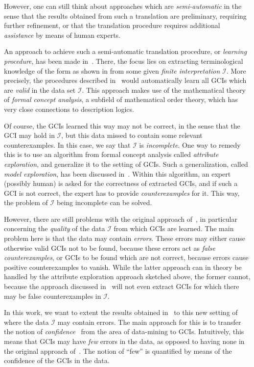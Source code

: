 However, one can still think about approaches which are \emph{semi-automatic} in the sense
that the results obtained from such a translation are preliminary, requiring further
refinement, or that the translation procedure requires additional \emph{assistance} by
means of human experts.

An approach to achieve such a semi-automatic translation procedure, or \emph{learning
  procedure}, has been made in~\cite{Diss-Felix}.  There, the focus lies on extracting
terminological knowledge of the form as shown in  from some given \emph{finite
  interpretation} $\mathcal{I}$.  More precisely, the procedures described
in~\cite{Diss-Felix} would automatically learn all GCIs which are \emph{valid} in the data
set $\mathcal{I}$.  This approach makes use of the mathematical theory of \emph{formal
  concept analysis}, a subfield of mathematical order theory, which has very close
connections to description logics.

Of course, the GCIs learned this way may not be correct, in the sense that the GCI may
hold in $\mathcal{I}$, but this data missed to contain some relevant counterexamples.  In
this case, we say that $\mathcal{I}$ is \emph{incomplete}.  One way to remedy this is to
use an algorithm from formal concept analysis called \emph{attribute exploration}, and
generalize it to the setting of GCIs.  Such a generalization, called \emph{model
  exploration}, has been discussed in~\cite{Diss-Felix}.  Within this algorithm, an expert
(possibly human) is asked for the correctness of extracted GCIs, and if such a GCI is not
correct, the expert has to provide \emph{counterexamples} for it.  This way, the problem
of $\mathcal{I}$ being incomplete can be solved.

However, there are still problems with the original approach of~\cite{Diss-Felix}, in
particular concerning the \emph{quality} of the data $\mathcal{I}$ from which GCIs are
learned.  The main problem here is that the data may contain \emph{errors}.  These errors
may either cause otherwise valid GCIs not to be found, because these errors act as
\emph{false counterexamples}, or GCIs to be found which are not correct, because errors
cause positive counterexamples to vanish.  While the latter approach can in theory be
handled by the attribute exploration approach sketched above, the former cannot, because
the approach discussed in~\cite{Diss-Felix} will not even extract GCIs for which there may
be false counterexamples in $\mathcal{I}$.

In this work, we want to extent the results obtained in~\cite{Diss-Felix} to this new
setting of where the data $\mathcal{I}$ may contain errors.  The main approach for this is
to transfer the notion of \emph{confidence}~\cite{arules:agrawal:association-rules} from
the area of data-mining to GCIs.  Intuitively, this means that GCIs may have \emph{few}
errors in the data, as opposed to having none in the original approach
of~\cite{Diss-Felix}.  The notion of \enquote{few} is quantified by means of the
confidence of the GCIs in the data.

